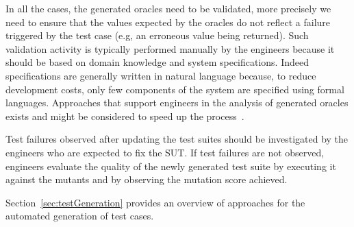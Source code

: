 In all the cases, the generated oracles need to be validated, more precisely we need to ensure that the values expected by the oracles do not reflect a failure triggered by the test case (e.g, an erroneous value being returned). Such validation activity is typically performed manually by the engineers because it should be based on domain knowledge and system specifications. Indeed specifications are generally written in natural language because, to reduce development costs, only few components of the system are specified using formal languages.
Approaches that support engineers in the analysis of generated oracles exists and might be considered to speed up the process~\cite{PastoreICSE2015}.

Test failures observed after updating the test suites should be investigated by the engineers who are expected to fix the SUT.
If test failures are not observed, engineers evaluate the quality of the newly generated test suite by executing it against the mutants and by observing the mutation score achieved. 

Section~\ref{sec:testGeneration} provides an overview of approaches for the automated generation of test cases.

